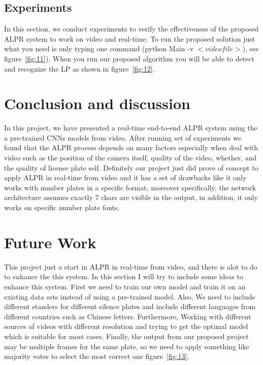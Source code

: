 \documentclass[letterpaper,12pt]{article}
\begin{document}
\subsection{Experiments}
In this section, we conduct experiments to verify the effectiveness of the proposed ALPR system to work on video and real-time. To run the proposed solution just what you need is only typing one command (python Main -v $<video file>$), see figure~\ref{fig:11}). When you run our proposed algorithm you will be able to detect and recognize the LP as shown in figure~\ref{fig:12}.




\section{Conclusion and discussion}
In this project, we have presented a real-time end-to-end ALPR system using the a pre-trained CNNs models from video. After running set of experiments we found that the ALPR process depends on many factors especially when deal with video such as the position of the camera itself, quality of the video, whether, and the quality of license plate self. Definitely our project just did prove of concept to apply ALPR in real-time from video and it has a set of drawbacks like it only works with number plates in a specific format, moreover specifically, the network architecture assumes exactly 7 chars are visible in the output, in addition, it only works on specific number plate fonts.


\section{Future Work}
This project just a start in ALPR in real-time from video, and there is alot to do to enhance the this system. In this section I will try to include some ideas to enhance this system. First we need to train our own model and train it on  an existing data sets instead of using a pre-trained model. Also, We need to include different standers for different silence plates and include different languages from different countries such as Chinese letters. Furthermore, Working with different sources of videos with different resolution and trying to get the optimal model which is suitable for most cases. Finally, the output from our proposed project may be multiple frames for the same plate, so we need to apply something like majority votes to select the most correct one figure~\ref{fig:13}.
\end{document}
